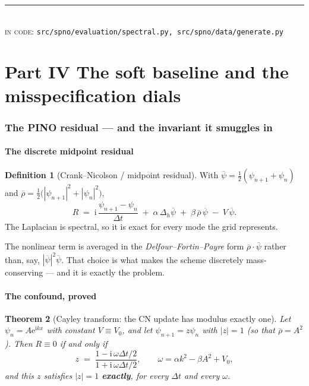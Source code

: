 \documentclass[11pt,a4paper]{article}
\theoremstyle{plain}
\newtheorem{theorem}{Theorem}[section]
\theoremstyle{definition}
\newtheorem{definition}[theorem]{Definition}
\theoremstyle{remark}
\newcommand{\iu}{\mathrm{i}}
\newcommand{\eu}{\mathrm{e}}
\newcommand{\lap}{\Delta}
\newcommand{\dt}{\Delta t}
\newcommand{\src}[1]{{\color{linknavy}\texttt{\footnotesize #1}}}
\newcommand{\sourcenote}[1]{%
  \par\vspace{0.35em}\noindent
  {\footnotesize\color{rulegray}\rule{\linewidth}{0.4pt}\\[0.25em]
  \textsc{in code:} \src{#1}}\par\vspace{0.5em}}
\begin{document}
\sourcenote{src/spno/evaluation/spectral.py, src/spno/data/generate.py}
\newpage
\part*{Part IV \quad The soft baseline and the misspecification dials}

\section{The PINO residual --- and the invariant it smuggles in}
\label{sec:pino}

\subsection{The discrete midpoint residual}

\begin{definition}[Crank--Nicolson / midpoint residual]
\label{def:cnresidual}
With $\overline\psi = \tfrac12(\psi_{n+1}+\psi_n)$ and
$\overline\rho = \tfrac12\bigl(|\psi_{n+1}|^2+|\psi_n|^2\bigr)$,
\[
R \;=\; \iu\,\frac{\psi_{n+1}-\psi_n}{\dt}
\;+\; \alpha\,\lap_h\overline\psi
\;+\; \beta\,\overline\rho\,\overline\psi
\;-\; V\,\overline\psi .
\]
The Laplacian is spectral, so it is exact for every mode the grid represents.
\end{definition}

The nonlinear term is averaged in the \emph{Delfour--Fortin--Payre} form
$\overline\rho\cdot\overline\psi$ rather than, say, $|\overline\psi|^2\overline\psi$. That
choice is what makes the scheme discretely mass-conserving --- and it is exactly the
problem.

\subsection{The confound, proved}

\begin{theorem}[Cayley transform: the CN update has modulus exactly one]
\label{thm:cayley}
Let $\psi_n = A\eu^{\iu kx}$ with constant $V\equiv V_0$, and let $\psi_{n+1}=z\psi_n$ with
$|z|=1$ (so that $\overline\rho = A^2$). Then $R\equiv 0$ if and only if
\begin{equation}
\label{eq:cayley}
z \;=\; \frac{1-\iu\,\omega\dt/2}{1+\iu\,\omega\dt/2},
\qquad \omega = \alpha k^2 - \beta A^2 + V_0,
\end{equation}
and this $z$ satisfies $|z| = 1$ \textbf{exactly}, for every $\dt$ and every $\omega$.
\end{theorem}
\end{document}
